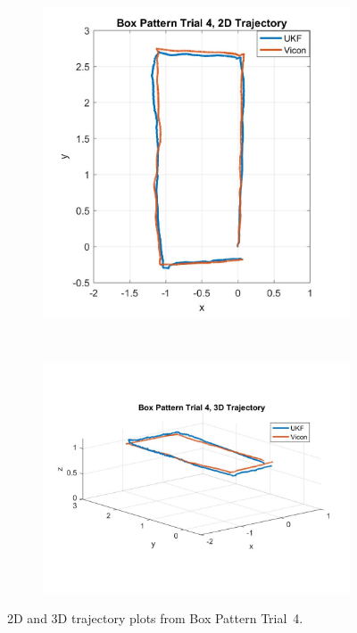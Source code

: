 \begin{figure}
    \centering
    \begin{subfigure}{0.4\textwidth}
        \includegraphics[width=\textwidth,left]{box4_2d}
    \end{subfigure}%
    ~ 
    \begin{subfigure}{0.6\textwidth}
        \centering
        \includegraphics[width=\textwidth,right]{box4_3d}
    \end{subfigure}
    \caption[Box Pattern Trial 4 Trajectory]{2D and 3D trajectory plots from Box Pattern Trial~4.}
    \label{fig:box4_traj}
\end{figure}

